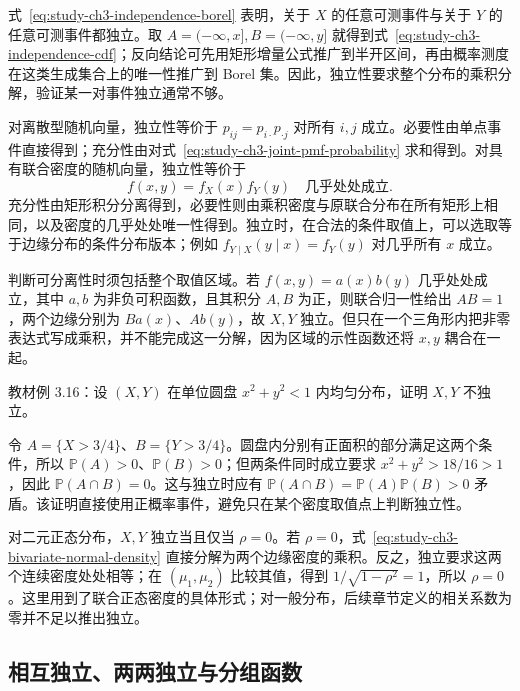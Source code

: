 式~\eqref{eq:study-ch3-independence-borel} 表明，关于 $X$ 的任意可测事件与关于 $Y$ 的任意可测事件都独立。取 $A=(-\infty,x],B=(-\infty,y]$ 就得到式~\eqref{eq:study-ch3-independence-cdf}；反向结论可先用矩形增量公式推广到半开区间，再由概率测度在这类生成集合上的唯一性推广到 Borel 集。因此，独立性要求整个分布的乘积分解，验证某一对事件独立通常不够。

对离散型随机向量，独立性等价于 $p_{ij}=p_{i\cdot}p_{\cdot j}$ 对所有 $i,j$ 成立。必要性由单点事件直接得到；充分性由对式~\eqref{eq:study-ch3-joint-pmf-probability} 求和得到。对具有联合密度的随机向量，独立性等价于
\begin{equation}
  f(x,y)=f_X(x)f_Y(y)\quad\text{几乎处处成立}.
  \label{eq:study-ch3-independence-density}
\end{equation}
充分性由矩形积分分离得到，必要性则由乘积密度与原联合分布在所有矩形上相同，以及密度的几乎处处唯一性得到。独立时，在合法的条件取值上，可以选取等于边缘分布的条件分布版本；例如 $f_{Y\mid X}(y\mid x)=f_Y(y)$ 对几乎所有 $x$ 成立。

判断可分离性时须包括整个取值区域。若 $f(x,y)=a(x)b(y)$ 几乎处处成立，其中 $a,b$ 为非负可积函数，且其积分 $A,B$ 为正，则联合归一性给出 $AB=1$，两个边缘分别为 $Ba(x)$、$Ab(y)$，故 $X,Y$ 独立。但只在一个三角形内把非零表达式写成乘积，并不能完成这一分解，因为区域的示性函数还将 $x,y$ 耦合在一起。

\begin{example}
\label{ex:study-ch3-disk-dependence}
教材例 3.16：设 $(X,Y)$ 在单位圆盘 $x^2+y^2<1$ 内均匀分布，证明 $X,Y$ 不独立。
\end{example}

\begin{solve}
令 $A=\{X>3/4\}$、$B=\{Y>3/4\}$。圆盘内分别有正面积的部分满足这两个条件，所以 $\mathbb P(A)>0$、$\mathbb P(B)>0$；但两条件同时成立要求 $x^2+y^2>18/16>1$，因此 $\mathbb P(A\cap B)=0$。这与独立时应有 $\mathbb P(A\cap B)=\mathbb P(A)\mathbb P(B)>0$ 矛盾。该证明直接使用正概率事件，避免只在某个密度取值点上判断独立性。
\end{solve}

对二元正态分布，$X,Y$ 独立当且仅当 $\rho=0$。若 $\rho=0$，式~\eqref{eq:study-ch3-bivariate-normal-density} 直接分解为两个边缘密度的乘积。反之，独立要求这两个连续密度处处相等；在 $(\mu_1,\mu_2)$ 比较其值，得到 $1/\sqrt{1-\rho^2}=1$，所以 $\rho=0$。这里用到了联合正态密度的具体形式；对一般分布，后续章节定义的相关系数为零并不足以推出独立。

\subsection{相互独立、两两独立与分组函数}

